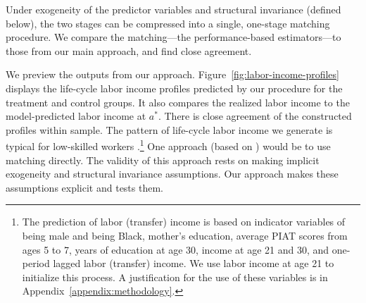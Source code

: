 Under exogeneity of the predictor variables and structural invariance (defined below), the two stages can be compressed into a single, one-stage matching procedure. We compare the matching---the performance-based estimators---to those from our main approach, and find close agreement. 

We preview the outputs from our approach. Figure~\ref{fig:labor-income-profiles} displays the life-cycle labor income profiles predicted by our procedure for the treatment and control groups. It also compares the realized labor income to the model-predicted labor income at $a^*$. There is close agreement of the constructed profiles within sample. The pattern of life-cycle labor income we generate is typical for low-skilled workers \citep{Blundell-etal_2015_J-Pub-E,Gladden_Taber_2000_WageProgression,Sanders-Taber_2012_AR,Lagakos_Moll_etal_2016_LifeCycle_NBER}.\footnote{The prediction of labor (transfer) income is based on indicator variables of being male and being Black, mother's education, average PIAT scores from ages 5 to 7, years of education at age 30, income at age 21 and 30, and one-period lagged labor (transfer) income. We use labor income at age 21 to initialize this process. A justification for the use of these variables is in Appendix~\ref{appendix:methodology}.} One approach (based on \citealp{Heckman_Ichimura_etal_1998_Econometrica}) would be to use matching directly. The validity of this approach rests on making implicit exogeneity and structural invariance assumptions. Our approach makes these assumptions explicit and tests them. 

